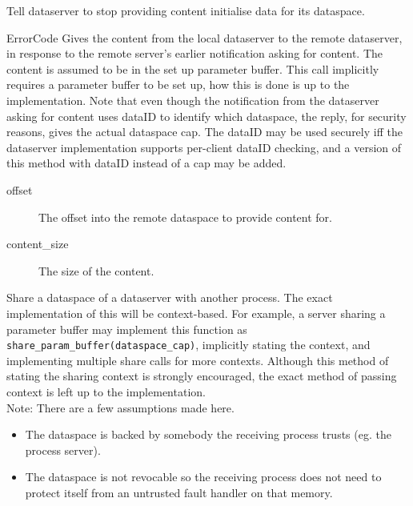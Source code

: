\begin{description}
    \item {}
    Tell dataserver to stop providing content initialise data for its dataspace.

    \item {}
        {ErrorCode}  
    Gives the content from the local dataserver to the remote dataserver, in response to the
    remote server's earlier notification asking for content. The content is assumed to be in
    the set up parameter buffer. This call implicitly requires a parameter buffer to be
    set up, how this is done is up to the implementation.
    Note that even though the notification from the dataserver asking for content uses dataID to
    identify which dataspace, the reply, for security reasons, gives the actual dataspace cap.
    The dataID may be used securely iff the dataserver implementation supports per-client dataID
    checking, and a version of this method with dataID instead of a cap may be added.
    \begin{description}
        \item [offset] The offset into the remote dataspace to provide content for.
        \item [content\_size] The size of the content.
    \end{description}

    \item {}
    Share a dataspace of a dataserver with another process. The exact implementation of this will be
    context-based. For example, a server sharing a parameter buffer may implement this function as
    \texttt{share\_param\_buffer(dataspace\_cap)}, implicitly stating the context, and implementing
    multiple share calls for more contexts. Although this method of stating the sharing context is
    strongly encouraged, the exact method of passing context is left up to the implementation. \\
    Note: There are a few assumptions made here.
    \begin{itemize}
    \item The dataspace is backed by somebody the receiving process trusts
        (eg. the process server).
    \item The dataspace is not revocable so the receiving process does
        not need to protect itself from an untrusted fault handler on that memory.
    \end{itemize}


\end{description}

